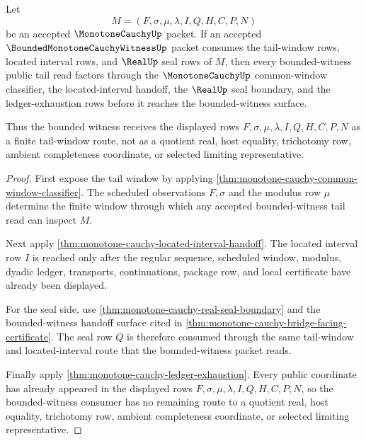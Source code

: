 \begin{theorem}
\label{thm:monotone-cauchy-bounded-witness-tail-factorization}
Let
$$
M=(F,\sigma,\mu,\lambda,I,Q,H,C,P,N)
$$
be an accepted $\MonotoneCauchyUp$ packet. If an accepted
$\BoundedMonotoneCauchyWitnessUp$ packet consumes the tail-window rows,
located interval rows, and $\RealUp$ seal rows of $M$, then every
bounded-witness public tail read factors through the $\MonotoneCauchyUp$
common-window classifier, the located-interval handoff, the $\RealUp$ seal
boundary, and the ledger-exhaustion rows before it reaches the bounded-witness
surface.

Thus the bounded witness receives the displayed rows
$F,\sigma,\mu,\lambda,I,Q,H,C,P,N$ as a finite tail-window route, not as a
quotient real, host equality, trichotomy row, ambient completeness coordinate,
or selected limiting representative.
\end{theorem}
\begin{proof}
First expose the tail window by applying
\autoref{thm:monotone-cauchy-common-window-classifier}. The scheduled
observations $F,\sigma$ and the modulus row $\mu$ determine the finite window
through which any accepted bounded-witness tail read can inspect $M$.

Next apply \autoref{thm:monotone-cauchy-located-interval-handoff}. The located
interval row $I$ is reached only after the regular sequence, scheduled window,
modulus, dyadic ledger, transports, continuations, package row, and local
certificate have already been displayed.

For the seal side, use \autoref{thm:monotone-cauchy-real-seal-boundary} and the
bounded-witness handoff surface cited in
\autoref{thm:monotone-cauchy-bridge-facing-certificate}. The seal row $Q$ is
therefore consumed through the same tail-window and located-interval route that
the bounded-witness packet reads.

Finally apply \autoref{thm:monotone-cauchy-ledger-exhaustion}. Every public
coordinate has already appeared in the displayed rows
$F,\sigma,\mu,\lambda,I,Q,H,C,P,N$, so the bounded-witness consumer has no
remaining route to a quotient real, host equality, trichotomy row, ambient
completeness coordinate, or selected limiting representative.
\end{proof}

